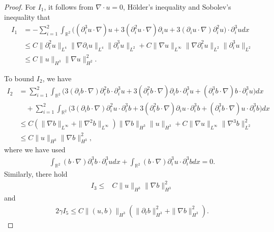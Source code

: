 \documentclass[reqno,11pt]{amsart}
\def\R{\mathbb R}
\numberwithin{Thm}{section}
\begin{document}
\begin{proof}
\par For $I_1$, it follows from $\nabla\cdot u=0$,
H\"{o}lder's inequality and Sobolev's inequality that
\begin{align}
I_{1}&=-\sum_{i=1}^2\int_{\R^2}\big((\partial_{i}^3u\cdot\nabla) u+3(\partial_{i}^2u\cdot\nabla)\partial_{i} u+3(\partial_{i}u\cdot\nabla)\partial_{i}^2 u\big)\cdot\partial_{i}^3udx\nonumber\\
&\leq C\|\partial_{i}^2u\|_{L^4}\|\nabla\partial_{i}u\|_{L^4}\|\partial_{i}^3u\|_{L^2}+C\|\nabla u\|_{L^{\infty}}\|\nabla\partial_{i}^2u\|_{L^2}\|\partial_{i}^3u\|_{L^2}\nonumber\\
&\leq C\|u\|_{H^{3}}\|\nabla u\|_{H^2}^2.\label{control I1}
\end{align}



To bound $I_2$, we have
\begin{align}
I_{2}&=
\sum_{i=1}^{2}\int_{\R^2}\Big(3(\partial_{i}b\cdot\nabla)\partial_{i}^2b\cdot\partial_{i}^3u+
3(\partial_{i}^2b\cdot\nabla)\partial_{i}b\cdot\partial_{i}^3u
+(\partial_{i}^3b\cdot\nabla) b\cdot\partial_{i}^3u\Big)dx\nonumber\\&\quad+\sum_{i=1}^{2}
\int_{\R^2}\Big(3(\partial_{i}b\cdot\nabla)\partial_{i}^2u\cdot\partial_{i}^3b+
3(\partial_{i}^2b\cdot\nabla)\partial_{i}u\cdot\partial_{i}^3b
+(\partial_{i}^3b\cdot\nabla) u\cdot\partial_{i}^3b\Big)dx\nonumber\\
&\leq C\left(\|\nabla b\|_{L^\infty}+\|\nabla^2 b\|_{L^\infty}\right)\|\nabla b\|_{H^3}\|u\|_{H^3}+C\|\nabla u\|_{L^\infty}\|\nabla^3b\|_{L^2}^2\nonumber\\
&\leq C\|u\|_{H^3}\|\nabla b\|_{H^3}^2,\label{control I2}
\end{align}
where we have used
\begin{align*}
\int_{\R^2}(b\cdot\nabla)\partial_{i}^3 b \cdot\partial_{i}^3udx+\int_{\R^2}(b\cdot\nabla)\partial_{i}^3 u \cdot\partial_{i}^3bdx=0.
\end{align*}
Similarly, there hold
\begin{align}
I_{3}
\leq &C\|u\|_{H^3}\|\nabla b\|_{H^3}^2\label{control I3}
\end{align}
and
\begin{align}
2\gamma I_5\leq C\|(u,b)\|_{H^3}\left(\|\partial_t b\|_{H^3}^2+\|\nabla b\|_{H^3}^2\right).\label{control I5}
\end{align}




\end{proof}
\end{document}

